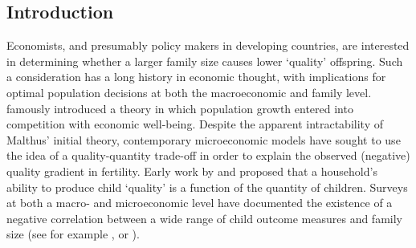 \documentclass{article}[11pt,subeqn]
\begin{document}
\begin{spacing}{1.5}	

\begin{abstract}
Given the endogenous nature of a family's fertility decisions, demonstrating the existence of a trade-off between child quality and child quantity requires the 
identification of a valid exclusion restriction in a quality-quantity model.  Prior work has suggested that the exogeneity of multiple births can be exploited to 
estimate this relationship.  I show that twin births are \emph{not} exogenous in a developing country setting.  Instead twin birth depends on a range of 
observable (and potentially unobservable) characteristics of the mother, such as height, BMI, and family income.  The resulting bias in typical 2SLS estimates 
is then examined via Monte Carlo simulation and empirically, using data on more than 1,000,000 births in 44 developing countries created by pooling the Demographic
and Health Surveys.  Given the poor performance of these estimates under simulation, an alternative methodology is employed to examine 
the quantity-quality model.  By controlling for observable determinants of family size and estimating the importance of unobservables, the plausibility of family 
size having any effect on education, an indicator of child `quality', is assessed. I find evidence suggesting that higher sibship reduces total educational attainment in a 
low-income setting, but that the impact of family size on school attendance is relatively small.  I show that these results vary by a country's income status, with 
the quantity-quality trade-off most significant in the lowest-income group.
\end{abstract}

\section{Introduction}
\label{scn:intro}
Economists, and presumably policy makers in developing countries, are interested in determining whether a larger family size causes lower `quality' offspring.  
Such a consideration has a long history in economic thought, with implications for optimal population decisions at both the macroeconomic and family level.  
\citet{Malthus1798} famously introduced a theory in which population growth entered into competition with economic well-being.  Despite the apparent 
intractability of Malthus' initial theory, contemporary microeconomic models have sought to use the idea of a quality-quantity trade-off in order to explain the 
observed (negative) quality gradient in fertility.  Early work by \citet{BeckerLewis1973} and \citet{BeckerTomes1976} proposed that a household's ability to 
produce child `quality' is a function of the quantity of children.  Surveys at both a macro- and microeconomic level have documented the existence of a 
negative correlation between a wide range of child outcome measures and family size (see for example \cite{Desai1995}, or \cite{Hanushek1992}).


\end{spacing}
\end{document}
